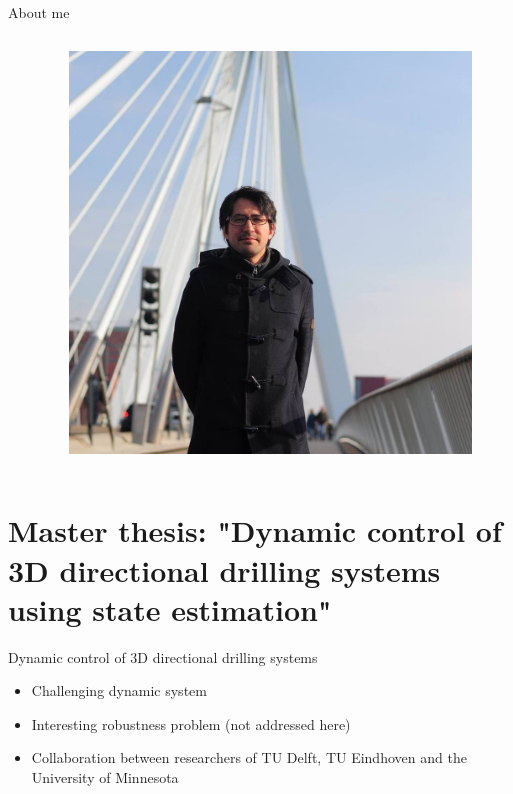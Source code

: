 \documentclass[10pt]{beamer}
\begin{document}
\begin{frame}{About me}
\begin{columns}
\begin{column}{0.6\textwidth}
\begin{itemize}
\begin{itemize}
				\end{itemize}
			\end{itemize}
		\end{column}
		\begin{column}{0.4\textwidth}
			\begin{figure}[ht]
				\vspace{-57pt}
				\includegraphics[width=1.5\textwidth]{images/yo.jpg}
			\end{figure}			
		\end{column}
	\end{columns}
\end{frame}
\section{Master thesis: "Dynamic control of 3D directional drilling systems using state estimation"}

\begin{frame}{Dynamic control of 3D directional drilling systems}
	\begin{itemize}\setlength\itemsep{2.5em}
		\item Challenging dynamic system
		\item Interesting robustness problem (not addressed here)
		\item Collaboration between researchers of TU Delft, TU Eindhoven and the University of Minnesota
	\end{itemize}
\end{frame}
\end{document}
